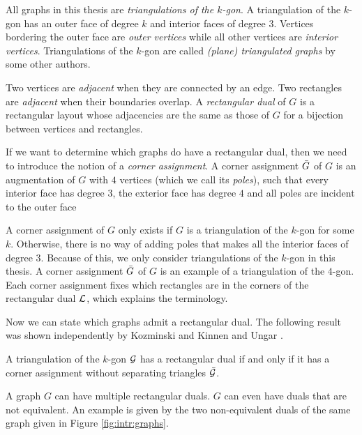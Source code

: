   All graphs in this thesis are \emph{triangulations of the $k$-gon}. A triangulation of the $k$-gon has an outer face of degree $k$ and interior faces of degree $3$.
  Vertices bordering the outer face are \emph{outer vertices} while all other vertices are \emph{interior vertices}.
  Triangulations of the $k$-gon are called \emph{(plane) triangulated graphs} by some other authors.

  Two vertices are \emph{adjacent} when they are connected by an edge. Two rectangles are \emph{adjacent} when their boundaries overlap. A \emph{rectangular dual} of $G$ is a rectangular layout whose adjacencies are the same as those of $G$ for a bijection between vertices and rectangles.

  If we want to determine which graphs do have a rectangular dual, then we need to introduce the notion of a \emph{corner assignment}.
  A corner assignment $\bar{G}$ of $G$ is an augmentation of $G$ with $4$ vertices (which we call its \emph{poles}), such that every interior face has degree $3$, the exterior face has degree $4$ and all poles are incident to the outer face

  A corner assignment of $G$ only exists if $G$ is a triangulation of the $k$-gon for some $k$. Otherwise, there is no way of adding poles that makes all the interior faces of degree $3$. Because of this, we only consider triangulations of the $k$-gon in this thesis. A corner assignment $\bar{G}$ of $G$ is an example of a triangulation of the $4$-gon. Each corner assignment fixes which rectangles are in the corners of the rectangular dual $\mathcal{L}$, which explains the terminology.


  Now we can state which graphs admit a rectangular dual. The following result was shown independently by Kozminski and Kinnen \cite{Kozminski1984} and Ungar \cite{Ungar1953}.

  \begin{thrm}
    \label{th:rect:exsitenceREctangularDual}
    A triangulation of the $k$-gon $\mathcal{G}$ has a rectangular dual if and only if it has a corner assignment without separating triangles $\bar{\mathcal{G}}$.
  \end{thrm}

  A graph $G$ can have multiple rectangular duals. $G$ can even have duals that are not equivalent. An example is given by the two non-equivalent duals of the same graph given in Figure \ref{fig:intr:graphs}.

